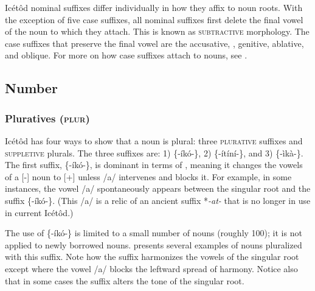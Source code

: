 Icétôd nominal suffixes differ individually in how they affix to noun roots. With the exception of five case suffixes, all nominal suffixes first delete the final vowel of the noun to which they attach. This is known as \textsc{subtractive} morphology. The case suffixes that preserve the final vowel are the accusative, , genitive, ablative, and oblique. For more on how case suffixes attach to nouns, see .




\subsection{Number}\label{sec:4.2}
\subsubsection{Pluratives (\textsc{plur})}\label{sec:4.2.1}

Icétôd has four ways to show that a noun is plural: three \textsc{plurative} suffixes and \textsc{suppletive} plurals. The three  suffixes are: 1) \{-íkó-\}, 2) \{-ítíní-\}, and 3) \{-ìkà-\}. The first  suffix, \{-íkó-\}, is dominant in terms of , meaning it changes the vowels of a [-] noun to [+] unless /a/ intervenes and blocks it. For example, in some instances, the vowel /a/ spontaneously appears between the singular root and the suffix \{-íkó-\}. (This /a/ is a relic of an ancient  suffix *\textit{{}-at-} that is no longer in use in current Icétôd.)

The use of \{-íkó-\} is limited to a small number of nouns (roughly 100); it is not applied to newly borrowed nouns.  presents several examples of nouns pluralized with this suffix. Note how the suffix harmonizes the vowels of the singular root except where the vowel /a/ blocks the leftward spread of harmony. Notice also that in some cases the suffix alters the tone of the singular root.



